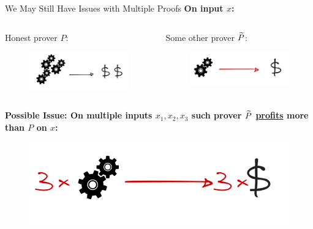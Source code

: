 \begin{frame}[t]{We May Still Have Issues with Multiple Proofs}
\large{\textbf{On input $x$:}}
\begin{columns}
\begin{block}{Honest prover $P$:}
	\begin{figure}
		\includegraphics[scale=0.18]{pics/honest-rew.png}
	\end{figure}
\end{block}
\bigskip
\begin{block}{Some other prover $\widetilde{P}$:}
	\begin{figure}
		\includegraphics[scale=0.18]{pics/dishonest-rew-one.png}
	\end{figure}
\end{block}
\end{columns}
\large{\textbf{Possible Issue: On multiple inputs $x_1, x_2, x_3$ such prover $\widetilde{P}$ \underline{profits} more than $P$ on $x$:}}

	\begin{figure}
		\includegraphics[scale=0.18]{pics/dishonest-rew-many.png}
	\end{figure}

\end{frame}

